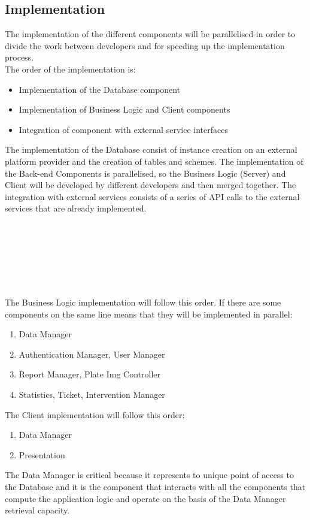 \documentclass{article}
\begin{document}
	\subsection{Implementation}
	The implementation of the different components will be parallelised in order to divide the work between developers and for speeding up the implementation process. \\
	The order of the implementation is:
	\begin{itemize}
		\item Implementation of the Database component
		\item Implementation of Business Logic and Client components
		\item Integration of component with external service interfaces 
	\end{itemize}
	The implementation of the Database consist of instance creation on an external  platform provider and the creation of tables and schemes. 
	The implementation of the Back-end Components is parallelised, so the Business Logic (Server) and Client will be developed by different developers and then merged together. 
	The integration with external services consists of a series of API calls to the external services that are already implemented. \\ \\ \\ \\ \\ \\ \\ \\
	The Business Logic implementation will follow this order. If there are some components on the same line means that they will be implemented in parallel:
	\begin{enumerate}
		\item Data Manager
		\item Authentication Manager, User Manager
		\item Report Manager, Plate Img Controller
		\item Statistics, Ticket, Intervention Manager
	\end{enumerate}
	The Client implementation will follow this order:
	\begin{enumerate}
		\item Data Manager
		\item Presentation
	\end{enumerate}
	The Data Manager is critical because it represents to unique point of access to the Database and it is the component that interacts with all the components that compute the application logic and operate on the basis of the Data Manager retrieval capacity.
\end{document}

